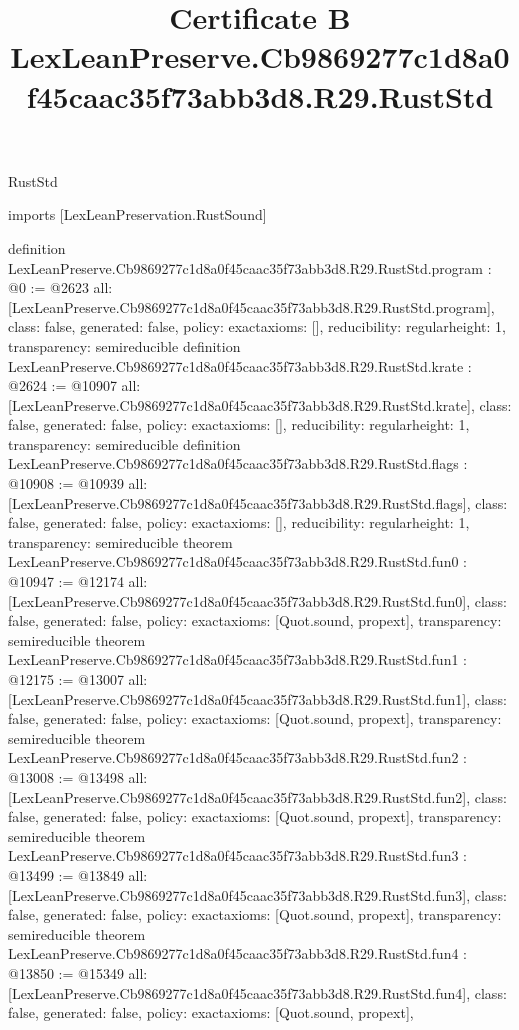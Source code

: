 \begin{lexlean}{RustStd}
\title{Certificate B LexLeanPreserve.Cb9869277c1d8a0f45caac35f73abb3d8.R29.RustStd}
\begin{coremodule}
imports [LexLeanPreservation.RustSound]

definition LexLeanPreserve.Cb9869277c1d8a0f45caac35f73abb3d8.R29.RustStd.program : @0 := @2623 {
  all: [LexLeanPreserve.Cb9869277c1d8a0f45caac35f73abb3d8.R29.RustStd.program],
  class: false,
  generated: false,
  policy: exact{axioms: []},
  reducibility: regular{height: 1},
  transparency: semireducible
}
definition LexLeanPreserve.Cb9869277c1d8a0f45caac35f73abb3d8.R29.RustStd.krate : @2624 := @10907 {
  all: [LexLeanPreserve.Cb9869277c1d8a0f45caac35f73abb3d8.R29.RustStd.krate],
  class: false,
  generated: false,
  policy: exact{axioms: []},
  reducibility: regular{height: 1},
  transparency: semireducible
}
definition LexLeanPreserve.Cb9869277c1d8a0f45caac35f73abb3d8.R29.RustStd.flags : @10908 := @10939 {
  all: [LexLeanPreserve.Cb9869277c1d8a0f45caac35f73abb3d8.R29.RustStd.flags],
  class: false,
  generated: false,
  policy: exact{axioms: []},
  reducibility: regular{height: 1},
  transparency: semireducible
}
theorem LexLeanPreserve.Cb9869277c1d8a0f45caac35f73abb3d8.R29.RustStd.fun0 : @10947 := @12174 {
  all: [LexLeanPreserve.Cb9869277c1d8a0f45caac35f73abb3d8.R29.RustStd.fun0],
  class: false,
  generated: false,
  policy: exact{axioms: [Quot.sound, propext]},
  transparency: semireducible
}
theorem LexLeanPreserve.Cb9869277c1d8a0f45caac35f73abb3d8.R29.RustStd.fun1 : @12175 := @13007 {
  all: [LexLeanPreserve.Cb9869277c1d8a0f45caac35f73abb3d8.R29.RustStd.fun1],
  class: false,
  generated: false,
  policy: exact{axioms: [Quot.sound, propext]},
  transparency: semireducible
}
theorem LexLeanPreserve.Cb9869277c1d8a0f45caac35f73abb3d8.R29.RustStd.fun2 : @13008 := @13498 {
  all: [LexLeanPreserve.Cb9869277c1d8a0f45caac35f73abb3d8.R29.RustStd.fun2],
  class: false,
  generated: false,
  policy: exact{axioms: [Quot.sound, propext]},
  transparency: semireducible
}
theorem LexLeanPreserve.Cb9869277c1d8a0f45caac35f73abb3d8.R29.RustStd.fun3 : @13499 := @13849 {
  all: [LexLeanPreserve.Cb9869277c1d8a0f45caac35f73abb3d8.R29.RustStd.fun3],
  class: false,
  generated: false,
  policy: exact{axioms: [Quot.sound, propext]},
  transparency: semireducible
}
theorem LexLeanPreserve.Cb9869277c1d8a0f45caac35f73abb3d8.R29.RustStd.fun4 : @13850 := @15349 {
  all: [LexLeanPreserve.Cb9869277c1d8a0f45caac35f73abb3d8.R29.RustStd.fun4],
  class: false,
  generated: false,
  policy: exact{axioms: [Quot.sound, propext]},
}
\end{coremodule}
\end{lexlean}
